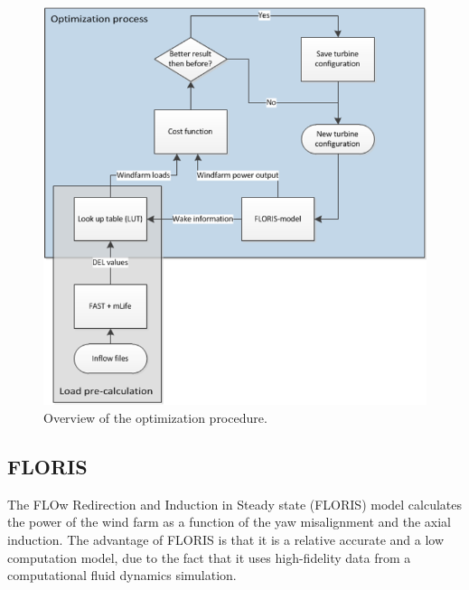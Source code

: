 	\begin{figure}
		\includegraphics[width=\linewidth]{./Figures/OptimizationProcess.png}
		\caption{Overview of the optimization procedure.}
		\label{fig:optim}
	\end{figure}


  


\subsection{FLORIS} The FLOw Redirection and Induction in Steady state (FLORIS) model calculates the power of the wind farm as a function of the yaw misalignment and the axial induction. \cite{Gebraad2016}
The advantage of FLORIS is that it is a relative accurate\cite{Dijk2016} and a low computation model, due to the fact that it uses high-fidelity data from a computational fluid dynamics simulation. 


